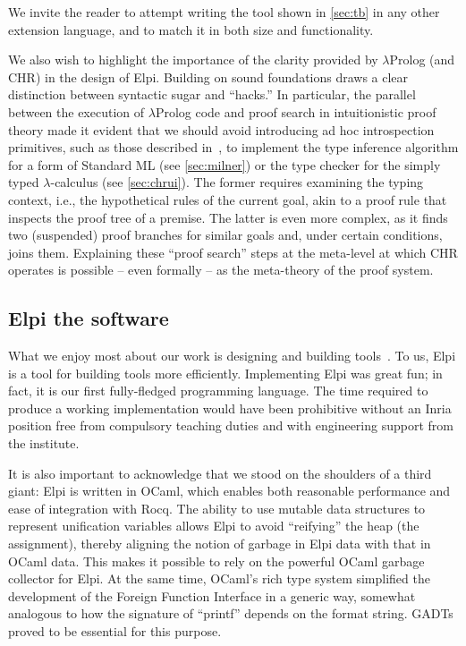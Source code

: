 \documentclass[a4paper, 11pt]{book}
\begin{document}
We invite the reader to attempt writing the  tool shown in
\cref{sec:tb} in any other extension language, and to match it in both
size and functionality.

We also wish to highlight the importance of the clarity provided by
$\lambda$Prolog (and CHR) in the design of Elpi. Building on sound foundations
draws a clear distinction between syntactic sugar and ``hacks.'' In particular,
the parallel between the execution of $\lambda$Prolog code and proof search in
intuitionistic proof theory made it evident that we should avoid introducing ad
hoc introspection primitives, such as those described in~\cite[Section 8 and
later]{10.1145/3236788}, to implement the type inference algorithm for a form
of Standard ML (see \cref{sec:milner}) or the type checker for the
simply typed $\lambda$-calculus (see \cref{sec:chrui}). The former
requires examining the typing context, i.e., the hypothetical rules of the
current goal, akin to a proof rule that inspects the proof tree of a premise.
The latter is even more complex, as it finds two (suspended) proof branches for
similar goals and, under certain conditions, joins them. Explaining these
``proof search'' steps at the meta-level at which CHR operates is possible -- even
formally -- as the meta-theory of the proof system.


\subsection{Elpi the software}


What we enjoy most about our work is designing and building tools~\cite{DBLP:journals/jar/AspertiCTZ07,gonthier:inria-00258384,Coq-refman}.
To us, Elpi is a tool for building tools more efficiently. Implementing Elpi was great fun; in fact, it is our first fully-fledged programming language. The time required to produce a working implementation would have been prohibitive without an Inria position free from compulsory teaching duties and with engineering support from the institute. %

It is also important to acknowledge that we stood on the shoulders of a third giant: Elpi is written in OCaml, which enables both reasonable performance and ease of integration with Rocq. The ability to use mutable data structures to represent unification variables allows Elpi to avoid ``reifying'' the heap (the assignment), thereby aligning the notion of garbage in Elpi data with that in OCaml data. This makes it possible to rely on the powerful OCaml garbage collector for Elpi. At the same time, OCaml's rich type system simplified the development of the Foreign Function Interface in a generic way, somewhat analogous to how the signature of ``printf'' depends on the format string. GADTs proved to be essential for this purpose.
\end{document}

